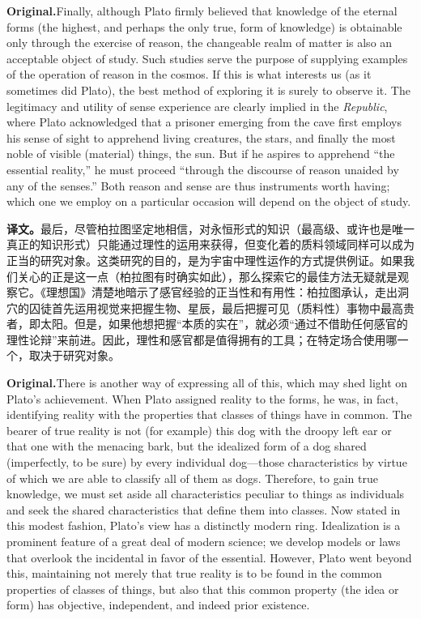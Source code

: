 \documentclass[UTF8]{ctexart}
\newcommand{\orig}{\par\noindent\textbf{Original.}\quad}
\newcommand{\zh}{\par\noindent\textbf{译文。}\quad}
\begin{document}
\orig Finally, although Plato firmly believed that knowledge of the eternal forms (the highest, and perhaps the only true, form of knowledge) is obtainable only through the exercise of reason, the changeable realm of matter is also an acceptable object of study. Such studies serve the purpose of supplying examples of the operation of reason in the cosmos. If this is what interests us (as it sometimes did Plato), the best method of exploring it is surely to observe it. The legitimacy and utility of sense experience are clearly implied in the \textit{Republic}, where Plato acknowledged that a prisoner emerging from the cave first employs his sense of sight to apprehend living creatures, the stars, and finally the most noble of visible (material) things, the sun. But if he aspires to apprehend ``the essential reality,'' he must proceed ``through the discourse of reason unaided by any of the senses.'' Both reason and sense are thus instruments worth having; which one we employ on a particular occasion will depend on the object of study.

\zh 最后，尽管柏拉图坚定地相信，对永恒形式的知识（最高级、或许也是唯一真正的知识形式）只能通过理性的运用来获得，但变化着的质料领域同样可以成为正当的研究对象。这类研究的目的，是为宇宙中理性运作的方式提供例证。如果我们关心的正是这一点（柏拉图有时确实如此），那么探索它的最佳方法无疑就是观察它。《理想国》清楚地暗示了感官经验的正当性和有用性：柏拉图承认，走出洞穴的囚徒首先运用视觉来把握生物、星辰，最后把握可见（质料性）事物中最高贵者，即太阳。但是，如果他想把握“本质的实在”，就必须“通过不借助任何感官的理性论辩”来前进。因此，理性和感官都是值得拥有的工具；在特定场合使用哪一个，取决于研究对象。

\orig There is another way of expressing all of this, which may shed light on Plato's achievement. When Plato assigned reality to the forms, he was, in fact, identifying reality with the properties that classes of things have in common. The bearer of true reality is not (for example) this dog with the droopy left ear or that one with the menacing bark, but the idealized form of a dog shared (imperfectly, to be sure) by every individual dog---those characteristics by virtue of which we are able to classify all of them as dogs. Therefore, to gain true knowledge, we must set aside all characteristics peculiar to things as individuals and seek the shared characteristics that define them into classes. Now stated in this modest fashion, Plato's view has a distinctly modern ring. Idealization is a prominent feature of a great deal of modern science; we develop models or laws that overlook the incidental in favor of the essential. However, Plato went beyond this, maintaining not merely that true reality is to be found in the common properties of classes of things, but also that this common property (the idea or form) has objective, independent, and indeed prior existence.
\end{document}
